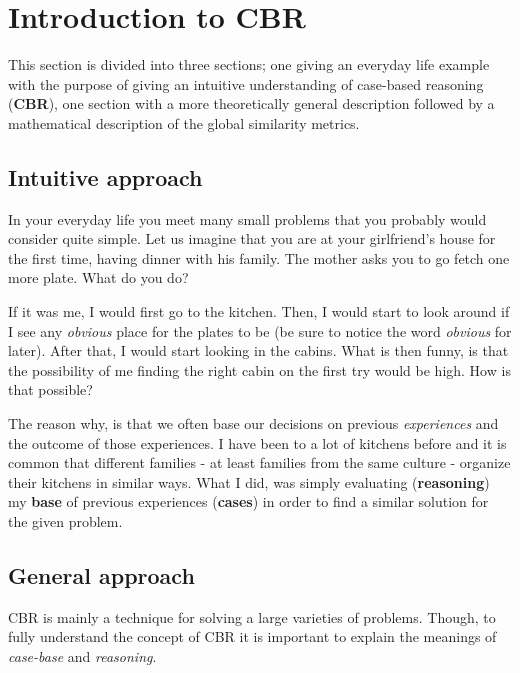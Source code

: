 \documentclass[12pt]{article}
\begin{document}
\clearpage

\tableofcontents
\clearpage

\section{Introduction to CBR}
\label{sec:intro}

This section is divided into three sections; one giving an everyday life example with the purpose of giving an intuitive understanding of case-based reasoning (\textbf{CBR}), one section with a more theoretically general description followed by a mathematical description of the global similarity metrics. 

\subsection{Intuitive approach}
\label{sec:intuitive}

In your everyday life you meet many small problems that you probably would consider quite simple. Let us imagine that you are at your girlfriend's house for the first time, having dinner with his family. The mother asks you to go fetch one more plate. What do you do?

If it was me, I would first go to the kitchen. Then, I would start to look around if I see any \textit{obvious} place for the plates to be (be sure to notice the word \textit{obvious} for later). After that, I would start looking in the cabins. What is then funny, is that the possibility of me finding the right cabin on the first try would be high. How is that possible? 

The reason why, is that we often base our decisions on previous \textit{experiences} and the outcome of those experiences. I have been to a lot of kitchens before and it is common that different families - at least families from the same culture - organize their kitchens in similar ways. What I did, was simply evaluating (\textbf{reasoning}) my \textbf{base} of previous experiences (\textbf{cases}) in order to find a similar solution for the given problem. 

\subsection{General approach}
\label{sec:general}

CBR is mainly a technique for solving a large varieties of problems. Though, to fully understand the concept of CBR it is important to explain the meanings of \textit{case-base} and \textit{reasoning}.
\end{document}
